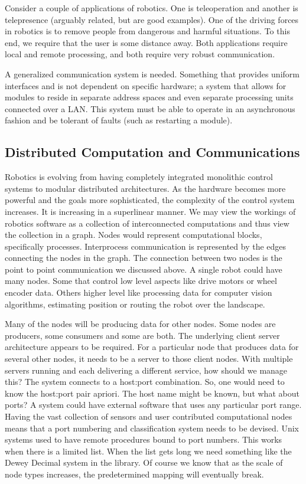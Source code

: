 Consider a couple of applications of robotics. One is teleoperation and
another is telepresence (arguably related, but are good examples). One
of the driving forces in robotics is to remove people from dangerous and
harmful situations. To this end, we require that the user is some
distance away. Both applications require local and remote processing,
and both require very robust communication.

A generalized communication system is needed. Something that provides
uniform interfaces and is not dependent on specific hardware; a system
that allows for modules to reside in separate address spaces and even
separate processing units connected over a LAN. This system must be able
to operate in an asynchronous fashion and be tolerant of faults (such as
restarting a module).

\hypertarget{distributed-computation-and-communications}{%
\subsection{Distributed Computation and
Communications}\label{distributed-computation-and-communications}}

Robotics is evolving from having completely integrated monolithic
control systems to modular distributed architectures. As the hardware
becomes more powerful and the goals more sophisticated, the complexity
of the control system increases. It is increasing in a superlinear
manner. We may view the workings of robotics software as a collection of
interconnected computations and thus view the collection in a graph.
Nodes would represent computational blocks, specifically processes.
Interprocess communication is represented by the edges connecting the
nodes in the graph. The connection between two nodes is the point to
point communication we discussed above. A single robot could have many
nodes. Some that control low level aspects like drive motors or wheel
encoder data. Others higher level like processing data for computer
vision algorithms, estimating position or routing the robot over the
landscape.

Many of the nodes will be producing data for other nodes. Some nodes are
producers, some consumers and some are both. The underlying client
server architecture appears to be required. For a particular node that
produces data for several other nodes, it needs to be a server to those
client nodes. With multiple servers running and each delivering a
different service, how should we manage this? The system connects to a
host:port combination. So, one would need to know the host:port pair
apriori. The host name might be known, but what about ports? A system
could have external software that uses any particular port range. Having
the vast collection of sensors and user contributed computational nodes
means that a port numbering and classification system needs to be
devised. Unix systems used to have remote procedures bound to port
numbers. This works when there is a limited list. When the list gets
long we need something like the Dewey Decimal system in the library. Of
course we know that as the scale of node types increases, the
predetermined mapping will eventually break.

